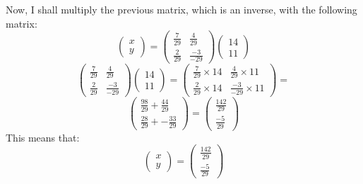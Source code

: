 \documentclass[a4paper,10pt]{article}
\begin{document}
      Now, I shall multiply the previous matrix, which is an inverse, with the following matrix:
      \begin{equation*}
	       \begin{pmatrix}
           x\\y
	       \end{pmatrix}
         =
         \begin{pmatrix}
           \frac{7}{29} & \frac{4}{29}\\
           \frac{2}{29} & \frac{-3}{-29}
         \end{pmatrix}
         \begin{pmatrix}
           14\\11
         \end{pmatrix}

      \end{equation*}
      \begin{equation*}
        \begin{pmatrix}
          \frac{7}{29} & \frac{4}{29}\\
          \frac{2}{29} & \frac{-3}{-29}
        \end{pmatrix}
        \begin{pmatrix}
          14\\11
        \end{pmatrix}
         =
        \begin{pmatrix}
          \frac{7}{29} \times 14 & \frac{4}{29} \times 11\\
          \frac{2}{29} \times 14 & \frac{-3}{-29} \times 11
        \end{pmatrix}
         =
      \end{equation*}
      \begin{equation*}
        \begin{pmatrix}
          \frac{98}{29} + \frac{44}{29}\\
          \frac{28}{29} + -\frac{33}{29}
        \end{pmatrix}
         =
        \begin{pmatrix}
          \frac{142}{29}\\\frac{-5}{29}
        \end{pmatrix}
      \end{equation*}
      This means that:
      \begin{equation*}
        \begin{pmatrix}
          x\\y
        \end{pmatrix}
         =
        \begin{pmatrix}
          \frac{142}{29}\\\frac{-5}{29}
        \end{pmatrix}
      \end{equation*}
\end{document}
